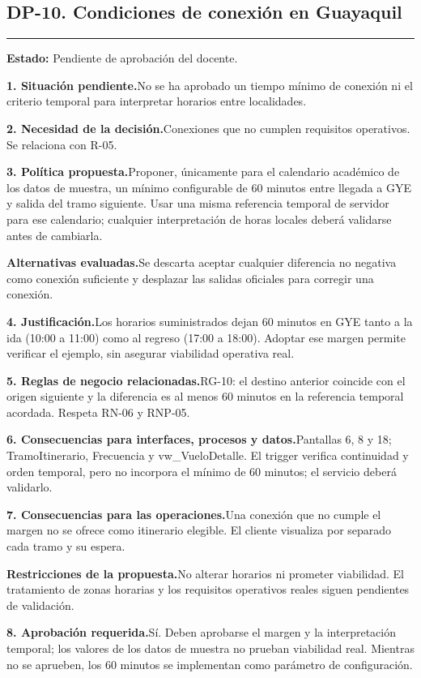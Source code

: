 \documentclass[11pt,a4paper]{article}
\newcommand{\fichacampo}[2]{\noindent\textbf{\color{azulvip}#1}\enspace #2\par\vspace{3pt}}
\begin{document}
\subsection{DP-10. Condiciones de conexión en Guayaquil}
{\color{doradovip}\rule{\textwidth}{.5pt}}
\textbf{Estado:} Pendiente de aprobación del docente.\par\vspace{4pt}
{\normalsize
\fichacampo{1. Situación pendiente.}{No se ha aprobado un tiempo mínimo de conexión ni el criterio temporal para interpretar horarios entre localidades.}
\fichacampo{2. Necesidad de la decisión.}{Conexiones que no cumplen requisitos operativos. Se relaciona con R-05.}
\fichacampo{3. Política propuesta.}{Proponer, únicamente para el calendario académico de los datos de muestra, un mínimo configurable de 60 minutos entre llegada a GYE y salida del tramo siguiente. Usar una misma referencia temporal de servidor para ese calendario; cualquier interpretación de horas locales deberá validarse antes de cambiarla.}
\fichacampo{Alternativas evaluadas.}{Se descarta aceptar cualquier diferencia no negativa como conexión suficiente y desplazar las salidas oficiales para corregir una conexión.}
\fichacampo{4. Justificación.}{Los horarios suministrados dejan 60 minutos en GYE tanto a la ida (10:00 a 11:00) como al regreso (17:00 a 18:00). Adoptar ese margen permite verificar el ejemplo, sin asegurar viabilidad operativa real.}
\fichacampo{5. Reglas de negocio relacionadas.}{RG-10: el destino anterior coincide con el origen siguiente y la diferencia es al menos 60 minutos en la referencia temporal acordada. Respeta RN-06 y RNP-05.}
\fichacampo{6. Consecuencias para interfaces, procesos y datos.}{Pantallas 6, 8 y 18; TramoItinerario, Frecuencia y vw\_VueloDetalle. El trigger verifica continuidad y orden temporal, pero no incorpora el mínimo de 60 minutos; el servicio deberá validarlo.}
\fichacampo{7. Consecuencias para las operaciones.}{Una conexión que no cumple el margen no se ofrece como itinerario elegible. El cliente visualiza por separado cada tramo y su espera.}
\fichacampo{Restricciones de la propuesta.}{No alterar horarios ni prometer viabilidad. El tratamiento de zonas horarias y los requisitos operativos reales siguen pendientes de validación.}
\fichacampo{8. Aprobación requerida.}{Sí. Deben aprobarse el margen y la interpretación temporal; los valores de los datos de muestra no prueban viabilidad real. Mientras no se aprueben, los 60 minutos se implementan como parámetro de configuración.}
}
\clearpage
\end{document}

